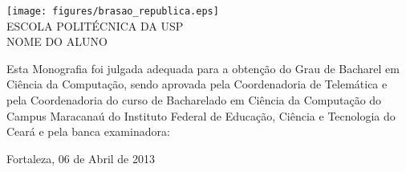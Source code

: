 \begin{folhadeaprovacao}
\setlength{\ABNTsignthickness}{0.2pt}
\setlength{\ABNTsignskip}{1.7cm}

\begin{center}
\texttt{[image: figures/brasao\_republica.eps]}\\
            {ESCOLA POLITÉCNICA DA USP} \\

    \vspace{1.5cm}
                                    {NOME DO ALUNO}\\
    \bfseries{}
\end{center}

Esta Monografia foi julgada adequada para a obtenção do Grau de Bacharel em Ciência da Computação, sendo aprovada pela Coordenadoria de Telemática e pela Coordenadoria do curso de Bacharelado em Ciência da Computação do Campus Maracanaú do Instituto Federal de Educação, Ciência e Tecnologia do Ceará e pela banca examinadora:

    \vspace{0.15cm}
    \vspace{0.15cm}%

    \begin{center}
        Fortaleza, 06 de Abril de 2013
    \end{center}
\end{folhadeaprovacao}
